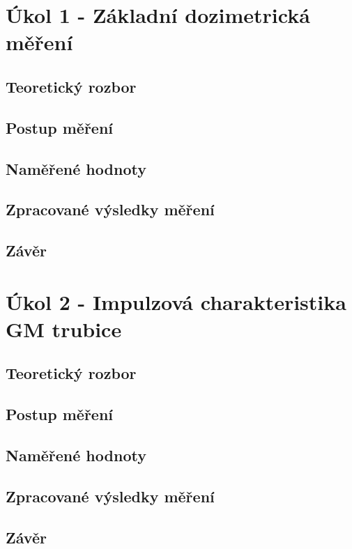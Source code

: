 \documentclass[fleqn]{protokol}
\begin{document}
\pagebreak 

\section{Úkol 1 - Základní dozimetrická měření}
    \subsection{Teoretický rozbor}
    \subsection{Postup měření}
    \subsection{Naměřené hodnoty}   
    \subsection{Zpracované výsledky měření}
    \subsection{Závěr}

\pagebreak

\section{Úkol 2 - Impulzová charakteristika GM trubice}
    \subsection{Teoretický rozbor}
    \subsection{Postup měření}
    \subsection{Naměřené hodnoty}   
    \subsection{Zpracované výsledky měření}
    \subsection{Závěr}

\pagebreak
\end{document}

